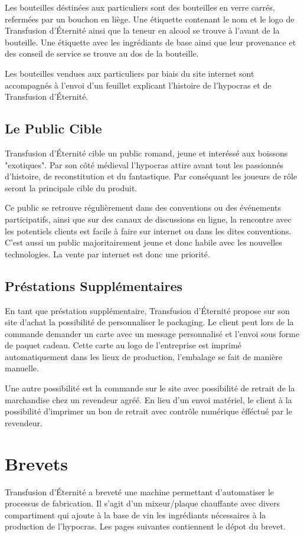 \documentclass[10pt,a4paper]{article}
\newcommand{\tde}{Transfusion d'Éternité}
\begin{document}
Les bouteilles déstinées aux particuliers sont des bouteilles en verre carrés, refermées par un bouchon en liège.
Une étiquette contenant le nom et le logo de \tde{} ainsi que la teneur en alcool se trouve à l'avant de la bouteille.
Une étiquette avec les ingrédiants de base ainsi que leur provenance et des conseil de service se trouve au dos de la bouteille.

Les bouteilles vendues aux particuliers par biais du site internet sont accompagnés à l'envoi d'un feuillet explicant l'histoire de l'hypocras et de \tde{}.

\subsection{Le Public Cible}
\tde{} cible un public romand, jeune et interéssé aux boissons "exotiques".
Par son côté médieval l'hypocras attire avant tout les passionnés d'histoire, de reconstitution et du fantastique.
Par conséquant les joueurs de rôle seront la principale cible du produit.

Ce public se retrouve régulièrement dans des conventions ou des événements participatifs, ainsi que sur des canaux de discussions en ligne, la rencontre avec les potentiels clients est facile à faire sur internet ou dans les dites conventions.
C'est aussi un public majoritairement jeune et donc habile avec les nouvelles technologies.
La vente par internet est donc une priorité.
\subsection{Préstations Supplémentaires}
En tant que préstation supplémentaire, \tde{} propose sur son site d'achat la possibilité de personnaliser le packaging.
Le client peut lors de la commande demander un carte avec un message personnalisé et l'envoi sous forme de paquet cadeau.
Cette carte au logo de l'entreprise est imprimé automatiquement dans les lieux de production, l'embalage se fait de manière manuelle.

Une autre possibilité est la commande sur le site avec possibilité de retrait de la marchandise chez un revendeur agréé.
En lieu d'un envoi matériel, le client à la possibilité d'imprimer un bon de retrait avec contrôle numérique éfféctué par le revendeur.
\section{Brevets}
\tde{} a breveté une machine permettant d'automatiser le processus de fabrication.
Il s'agit d'un mixeur/plaque chauffante avec divers compartiment qui ajoute à la base de vin les ingrédiants nécessaires à la production de l'hypocras.
Les pages suivantes contiennent le dépot du brevet.
\end{document}

